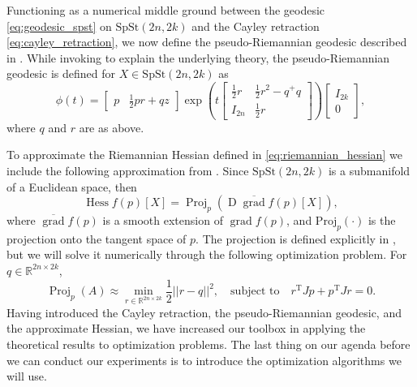 Functioning as a numerical middle ground between the geodesic \eqref{eq:geodesic_spst} on $\mathrm{SpSt}(2n, 2k)$ and the Cayley retraction \eqref{eq:cayley_retraction}, we now define the pseudo-Riemannian geodesic described in \cite[p.~10]{BendokatZimmermann2021}. While invoking \cite{BendokatZimmermann2021} to explain the underlying theory, the pseudo-Riemannian geodesic is defined for $X\in \mathrm{SpSt}(2n, 2k)$ as 
%
\begin{equation*}
\phi(t)=\begin{bmatrix}
p & \frac{1}{2}pr+qz
\end{bmatrix}\exp\left( t\begin{bmatrix}
\frac{1}{2}r  & \frac{1}{2}r^{2}-q^{+}q \\
I_{2n} & \frac{1}{2}r
\end{bmatrix} \right)
\begin{bmatrix}
I_{2k} \\
0
\end{bmatrix},
\end{equation*}
%
where $q$ and $r$ are as above. 

To approximate the Riemannian Hessian defined in \eqref{eq:riemannian_hessian} we include the following approximation from \cite[Corr.~5.16]{Boumal2023}. Since $\mathrm{SpSt}(2n, 2k)$ is a submanifold of a Euclidean space, then
%
\begin{equation}\label{eq:approximate_hessian}
\operatorname{Hess}f(p)[X]=\operatorname{Proj}_{p}(\operatorname{D}\overline{\operatorname{grad}}f(p)[X]),
\end{equation}
%
where $\overline{\operatorname{grad}}f(p)$ is a smooth extension of $\operatorname{grad}f(p)$, and $\mathrm{Proj}_{p}(\cdot)$ is the projection onto the tangent space of $p$. The projection is defined explicitly in \cite[Lemma~2.3]{JensenZimmermann2024}, but we will solve it numerically through the following optimization problem. For $q\in \mathbb{R}^{2n\times 2k}$,
%
\begin{equation*}
\operatorname{Proj}_{p}(A)\approx \operatorname*{min}_{r\in \mathbb{R}^{2n\times2k}} \frac{1}{2}\lvert \lvert r-q \rvert  \rvert ^{2},\quad\text{subject to}\quad r^{\mathrm{T}}Jp+p^{\mathrm{T}}Jr=0.
\end{equation*}
%
Having introduced the Cayley retraction, the pseudo-Riemannian geodesic, and the approximate Hessian, we have increased our toolbox in applying the theoretical results to optimization problems. The last thing on our agenda before we can conduct our experiments is to introduce the optimization algorithms we will use. 